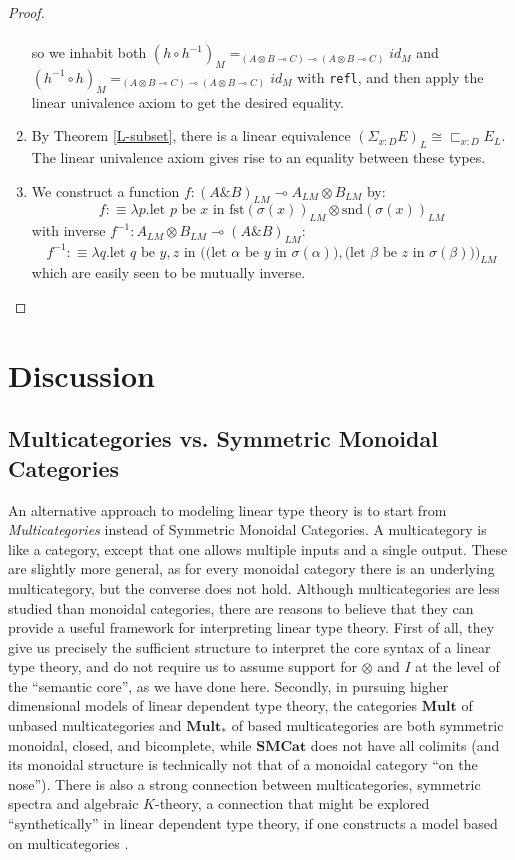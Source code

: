 \documentclass[a4paper,english]{lipics-v2018}
\begin{document}
\begin{theorem}
\begin{proof}
\begin{enumerate}
\[\begin{split}
        \end{split}
      \]
      so we inhabit both $(h \circ h^{-1})_M =_{(A \otimes B \multimap C) \multimap (A \otimes B \multimap C)} id_M$ and $(h^{-1} \circ h)_M =_{(A \otimes B \multimap C) \multimap (A \otimes B \multimap C)} id_M$ with \texttt{refl}, and then apply the linear univalence axiom to get the desired equality.
    \item By Theorem \ref{L-subset}, there is a linear equivalence $(\Sigma_{x :D}E)_L \cong \sqsubset_{x :D}E_L$. The linear univalence axiom gives rise to an equality between these types.
    \item We construct a function $f : (A \& B)_{LM} \multimap A_{LM} \otimes B_{LM}$ by:
      \[
        f :\equiv \lambda p. \text{let $p$ be $x$ in $\text{fst}(\sigma(x))_{LM} \otimes \text{snd}(\sigma(x))_{LM}$}
      \]
      with inverse $f^{-1} : A_{LM} \otimes B_{LM} \multimap  (A \& B)_{LM}$:
      \[
        f^{-1} :\equiv \lambda q. \text{let $q$ be $y, z$ in $\Big (\big ($let $\alpha$ be $y$ in $\sigma(\alpha) \big ), \big ($let $\beta$ be $z$ in $\sigma(\beta) \big) \Big )_{LM}$}
      \]
      which are easily seen to be mutually inverse.
      \end{enumerate}
    \end{proof}
  \end{theorem}
  \newpage
  \section{Discussion}\label{discussion}
  \subsection{Multicategories vs. Symmetric Monoidal Categories}
  An alternative approach to modeling linear type theory is to start from \textit{Multicategories} instead of Symmetric Monoidal Categories. A multicategory is like a category, except that one allows multiple inputs and a single output. These are slightly more general, as for every monoidal category there is an underlying multicategory, but the converse does not hold. Although multicategories are less studied than monoidal categories, there are reasons to believe that they can provide a useful framework for interpreting linear type theory. First of all, they give us precisely the sufficient structure to interpret the core syntax of a linear type theory, and do not require us to assume support for $\otimes$ and $I$ at the level of the ``semantic core'', as we have done here. Secondly, in pursuing higher dimensional models of linear dependent type theory, the categories $\mathbf{Mult}$ of unbased multicategories and $\mathbf{Mult}_*$ of based multicategories are both symmetric monoidal, closed, and bicomplete, while $\mathbf{SMCat}$ does not have all colimits (and its monoidal structure is technically not that of a monoidal category ``on the nose''). There is also a strong connection between multicategories, symmetric spectra and algebraic $K$-theory, a connection that might be explored ``synthetically'' in linear dependent type theory, if one constructs a model based on multicategories \cite{elmendorf2009permutative}.
\end{document}
